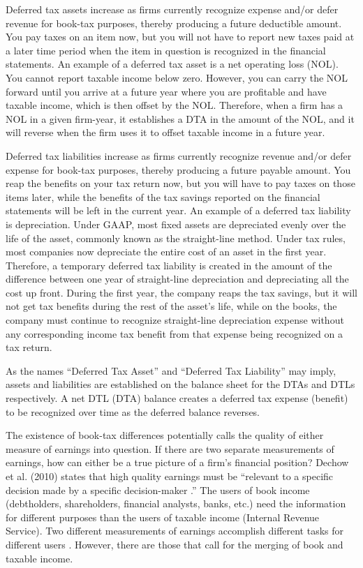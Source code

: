 \documentclass{article}
\begin{document}
Deferred tax assets increase as firms currently recognize expense and/or defer revenue for book-tax purposes, thereby producing a future deductible amount. You pay taxes on an item now, but you will not have to report new taxes paid at a later time period when the item in question is recognized in the financial statements. An example of a deferred tax asset is a net operating loss (NOL). You cannot report taxable income below zero. However, you can carry the NOL forward until you arrive at a future year where you are profitable and have taxable income, which is then offset by the NOL. Therefore, when a firm has a NOL in a given firm-year, it establishes a DTA in the amount of the NOL, and it will reverse when the firm uses it to offset taxable income in a future year.

Deferred tax liabilities increase as firms currently recognize revenue and/or defer expense for book-tax purposes, thereby producing a future payable amount. You reap the benefits on your tax return now, but you will have to pay taxes on those items later, while the benefits of the tax savings reported on the financial statements will be left in the current year. An example of a deferred tax liability is depreciation. Under GAAP, most fixed assets are depreciated evenly over the life of the asset, commonly known as the straight-line method. Under tax rules, most companies now depreciate the entire cost of an asset in the first year. Therefore, a temporary deferred tax liability is created in the amount of the difference between one year of straight-line depreciation and depreciating all the cost up front. During the first year, the company reaps the tax savings, but it will not get tax benefits during the rest of the asset’s life, while on the books, the company must continue to recognize straight-line depreciation expense without any corresponding income tax benefit from that expense being recognized on a tax return.

As the names “Deferred Tax Asset” and “Deferred Tax Liability” may imply, assets and liabilities are established on the balance sheet for the DTAs and DTLs respectively. A net DTL (DTA) balance creates a deferred tax expense (benefit) to be recognized over time as the deferred balance reverses.

The existence of book-tax differences potentially calls the quality of either measure of earnings into question. If there are two separate measurements of earnings, how can either be a true picture of a firm’s financial position? Dechow et al. (2010) states that high quality earnings must be “relevant to a specific decision made by a specific decision-maker \citet{Dechow10}.” The users of book income (debtholders, shareholders, financial analysts, banks, etc.) need the information for different purposes than the users of taxable income (Internal Revenue Service). Two different measurements of earnings accomplish different tasks for different users \citet{Blaylock15}. However, there are those that call for the merging of book and taxable income.
\end{document}

